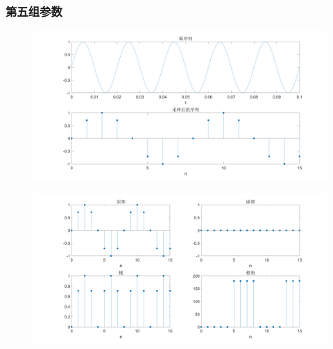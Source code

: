 \documentclass{../source/Experiment copy}
\begin{document}
\subsubsection{第五组参数}
\begin{figure}[H]
    \centering
    \includegraphics[width = \textwidth]{src/exp2_5_1.png}
\end{figure}

\begin{figure}[H]
    \centering
    \includegraphics[width = \textwidth]{src/exp2_5_2.png}
\end{figure}
\end{document}
